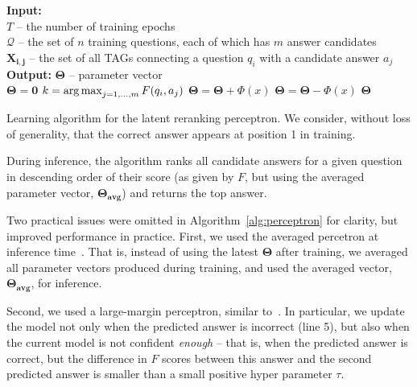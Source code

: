 \begin{algorithm}[t]                      %
                 \small
\begin{algorithmic}[1]                    %
    \STATE \textbf{Input:}{$ $\\
$T$ -- the number of training epochs}\\
$\boldsymbol{\mathcal{Q}}$ -- the set of $n$ training questions, each of which has $m$ answer candidates\\
$\boldsymbol{X_{i,j}}$ -- the set of all TAGs connecting a question $q_i$ with a candidate answer $a_j$\\
    \STATE \textbf{Output:}{ $\boldsymbol{\Theta}$ -- parameter vector\\}
    \STATE $\boldsymbol{\Theta} = \boldsymbol{0}$\;
			\STATE $k = \operatorname*{arg\,max}_{j = 1, \dots, m} F(q_i, a_j)$
					\STATE $\boldsymbol{\Theta} = \boldsymbol{\Theta} + \Phi(x)$
				\ENDFOR
					\STATE $\boldsymbol{\Theta} = \boldsymbol{\Theta} - \Phi(x)$
				\ENDFOR
			\ENDIF
		\ENDFOR
	\ENDFOR
	\RETURN $\boldsymbol{\Theta}$
\end{algorithmic}
\caption{ Learning algorithm for the latent reranking perceptron. We consider, without loss of generality, that the correct answer appears at position 1 in training.}   
\label{alg:perceptron}
\end{algorithm}



{}
During inference, the algorithm ranks all candidate answers for a given question in descending order of their score (as given by $F$, but using the averaged parameter vector, $\boldsymbol{\Theta_{avg}}$) and returns the top answer.

{}
Two practical issues were omitted in Algorithm~\ref{alg:perceptron} for clarity, but improved performance in practice. First, we used the averaged percetron at inference time~\cite{Collins:2002:DTM}. That is, instead of using the latest $\boldsymbol{\Theta}$ after training, we averaged all parameter vectors produced during training, and used the averaged vector, $\boldsymbol{\Theta_{avg}}$, for inference.

Second, we used a large-margin perceptron, similar to~\cite{Surdeanu:11}. In particular, we update the model not only when the predicted answer is incorrect (line 5), but also when the current model is not confident {\em enough} -- that is, when the predicted answer is correct, but the difference in $F$ scores between this answer and the second predicted answer is smaller than a small positive hyper parameter $\tau$. 



